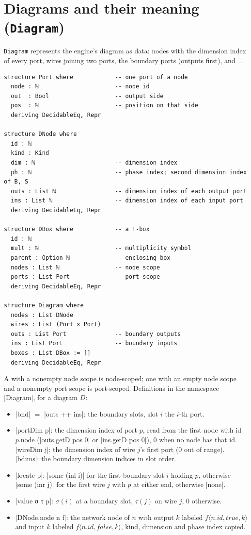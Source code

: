 \section{Diagrams and their meaning (\texttt{Diagram})}\label{sec:lean-core-diagram}

\texttt{Diagram} represents the engine's diagram as data: nodes with the dimension index of every
port, wires joining two ports, the boundary ports (outputs first), and \bboxes~\cite{carette2022bangboxes}.

\begin{lstlisting}[style=leancore]
structure Port where            -- one port of a node
  node : ℕ                      -- node id
  out  : Bool                   -- output side
  pos  : ℕ                      -- position on that side
  deriving DecidableEq, Repr

structure DNode where
  id : ℕ
  kind : Kind
  dim : ℕ                       -- dimension index
  ph : ℕ                        -- phase index; second dimension index of B, S
  outs : List ℕ                 -- dimension index of each output port
  ins : List ℕ                  -- dimension index of each input port
  deriving DecidableEq, Repr

structure DBox where            -- a !-box
  id : ℕ
  mult : ℕ                      -- multiplicity symbol
  parent : Option ℕ             -- enclosing box
  nodes : List ℕ                -- node scope
  ports : List Port             -- port scope
  deriving DecidableEq, Repr

structure Diagram where
  nodes : List DNode
  wires : List (Port × Port)
  outs : List Port              -- boundary outputs
  ins : List Port               -- boundary inputs
  boxes : List DBox := []
  deriving DecidableEq, Repr
\end{lstlisting}

A \bbox{} with a nonempty node scope is node-scoped; one with an empty node scope and a nonempty port
scope is port-scoped. Definitions in the namespace \lean|Diagram|, for a diagram $D$:
\begin{itemize}
\item \lean|bnd| $=$ \lean|outs ++ ins|: the boundary slots, slot $i$ the $i$-th port.
\item \lean|portDim p|: the dimension index of port $p$, read from the first node with id
  $p.\mathrm{node}$ (\lean|outs.getD pos 0| or \lean|ins.getD pos 0|), $0$ when no node has that id.
  \lean|wireDim j|: the dimension index of wire $j$'s first port ($0$ out of range).
  \lean|bdims|: the boundary dimension indices in slot order.
\item \lean|locate p|: \lean|some (inl i)| for the first boundary slot $i$ holding $p$, otherwise
  \lean|some (inr j)| for the first wire $j$ with $p$ at either end, otherwise \lean|none|.
\item \leanLLone|value σ τ p|: $\sigma(i)$ at a boundary slot, $\tau(j)$ on wire $j$, $0$ otherwise.
\item \lean|DNode.node n f|: the network node of $n$ with output $k$ labeled $f\langle n.id,\mathit{true},k\rangle$
  and input $k$ labeled $f\langle n.id,\mathit{false},k\rangle$, kind, dimension and phase index copied.
\end{itemize}

